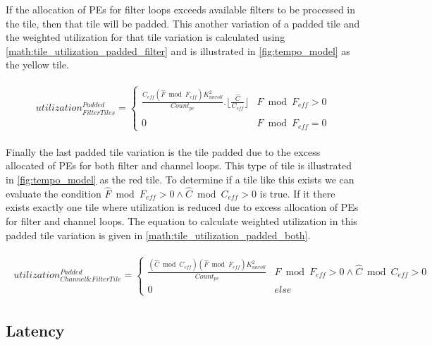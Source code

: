 If the allocation of PEs for filter loops exceeds available filters to be
processed in the tile, then that tile will be padded. This another variation of
a padded tile and the weighted utilization for that tile variation is calculated
using \autoref{math:tile_utilization_padded_filter} and is illustrated in
\autoref{fig:tempo_model} as the yellow tile.

\begin{align}
    \begin{gathered}
        utilization^{Padded}_{FilterTiles} = \begin{cases} \frac{ C_{eff} (\hat{F} \bmod F_{eff}) K_{unroll}^2}{Count_{pe}}.\lfloor \frac{\hat{C}}{C_{eff}} \rfloor
            & \hat{F} \bmod F_{eff} > 0 \\ 0
            & \hat{F} \bmod F_{eff} = 0 \end{cases}
            \end{gathered}
    \label{math:tile_utilization_padded_filter}
\end{align}

Finally the last padded tile variation is the tile padded due to the excess
allocated of PEs for both filter and channel loops. This type of tile is
illustrated in \autoref{fig:tempo_model} as the red tile.  To determine if a tile like this
exists we can evaluate the condition $\hat{F} \bmod F_{eff} > 0 \land \hat{C}
\bmod C_{eff} > 0$ is true. If it there exists exactly one tile where
utilization is reduced due to excess allocation of PEs for filter and channel
loops. The equation to calculate weighted utilization in this padded tile
variation is given in \autoref{math:tile_utilization_padded_both}.

\begin{align}
    \begin{gathered}
         utilization^{Padded}_{Channel\&FilterTile} = \begin{cases} \frac{(\hat{C} \bmod C_{eff}) (\hat{F} \bmod F_{eff}) K_{unroll}^2}{Count_{pe}} & \hat{F} \bmod F_{eff} > 0 \land \hat{C} \bmod C_{eff} > 0 \\0  & else\end{cases}
            \end{gathered}
    \label{math:tile_utilization_padded_both}
\end{align}

\subsection{Latency}
\label{chap:dataflow_dse:exploring:tempo_model:latency}

